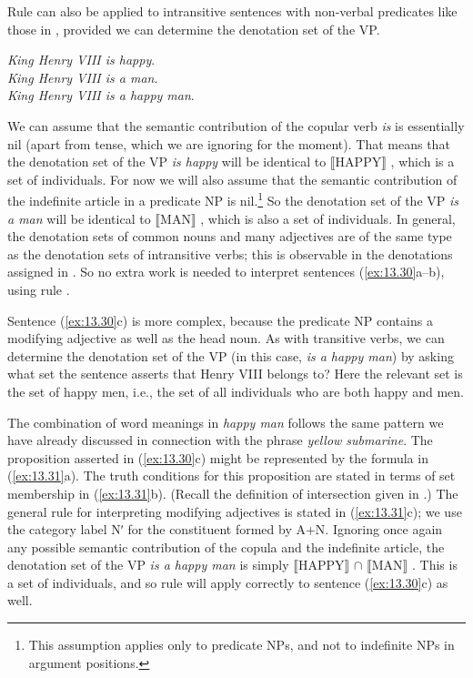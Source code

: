 Rule  can also be applied to intransitive sentences with non-verbal predicates like those in , provided we can determine the denotation set of the VP.


\ea \label{ex:13.30}
\ea \textit{King Henry VIII is happy}.\\
\ex \textit{King Henry VIII is a man}.\\
\ex \textit{King Henry VIII is a happy man}.
                       \z
\z


We can assume that the semantic contribution of the copular verb \textit{is} is essentially nil (apart from tense, which we are ignoring for the moment). That means that the denotation set of the VP \textit{is happy} will be identical to $\llbracket$HAPPY$\rrbracket$ , which is a set of individuals. For now we will also assume that the semantic contribution of the indefinite article in a predicate NP is nil.\footnote{This assumption applies only to predicate NPs, and not to indefinite NPs in argument positions.} So the denotation set of the VP \textit{is a man} will be identical to $\llbracket$MAN$\rrbracket$ , which is also a set of individuals. In general, the denotation sets of common nouns and many adjectives are of the same type as the denotation sets of intransitive verbs; this is observable in the denotations assigned in . So no extra work is needed to interpret sentences (\ref{ex:13.30}a--b), using rule .



Sentence (\ref{ex:13.30}c) is more complex, because the predicate NP contains a modifying adjective as well as the head noun. As with transitive verbs, we can determine the denotation set of the VP (in this case, \textit{is a happy man}) by asking what set the sentence asserts that Henry VIII belongs to? Here the relevant set is the set of happy men, i.e., the set of all individuals who are both happy and men.



The combination of word meanings in \textit{happy man} follows the same pattern we have already discussed in connection with the phrase \textit{yellow submarine}. The proposition asserted in (\ref{ex:13.30}c) might be represented by the formula in (\ref{ex:13.31}a). The truth conditions for this proposition are stated in terms of set membership in (\ref{ex:13.31}b). (Recall the definition of intersection given in .) The general rule for interpreting modifying adjectives is stated in (\ref{ex:13.31}c); we use the category label Nʹ for the constituent formed by A+N. Ignoring once again any possible semantic contribution of the copula and the indefinite article, the denotation set of the VP \textit{is a happy man} is simply $\llbracket$HAPPY$\rrbracket$  ${\cap}$ $\llbracket$MAN$\rrbracket$ . This is a set of individuals, and so rule  will apply correctly to sentence (\ref{ex:13.30}c) as well.


